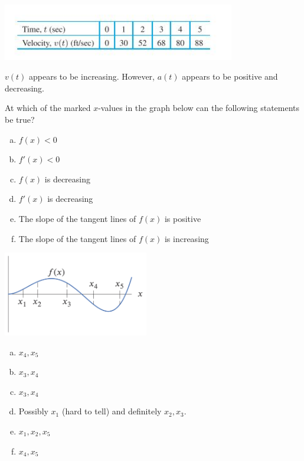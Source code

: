 \documentclass[11pt]{exam}
\begin{document}
\begin{questions}
\includegraphics[width=4in]{Figures/table.jpg}
\begin{solution}
  \(v(t)\) appears to be increasing. However, \(a(t)\) appears to be
  positive and decreasing.
\end{solution}
\question At which of the marked \(x\)-values in the graph below can
  the following statements be true?\\
  \begin{minipage}{0.6\linewidth}
    \begin{enumerate}[(a)]
    \item \(f(x) < 0\)
    \item \(f'(x) < 0\)
    \item \(f(x)\) is decreasing
    \item \(f'(x)\) is decreasing
    \item The slope of the tangent lines of \(f(x)\) is positive
    \item The slope of the tangent lines of \(f(x)\) is increasing
    \end{enumerate}
  \end{minipage}
  \begin{minipage}{0.4\linewidth}
    \includegraphics[width=2.5in]{Figures/figure256}
  \end{minipage}
  \begin{solution}
    \begin{enumerate}[(a)]
    \item \(x_4,x_5\)
    \item \(x_3,x_4\)
    \item \(x_3,x_4\)
    \item Possibly \(x_1\) (hard to tell) and definitely \(x_2,x_3\).
    \item \(x_1, x_2, x_5\)
    \item \(x_4, x_5\)

\end{enumerate}
\end{solution}
\end{questions}
\end{document}
